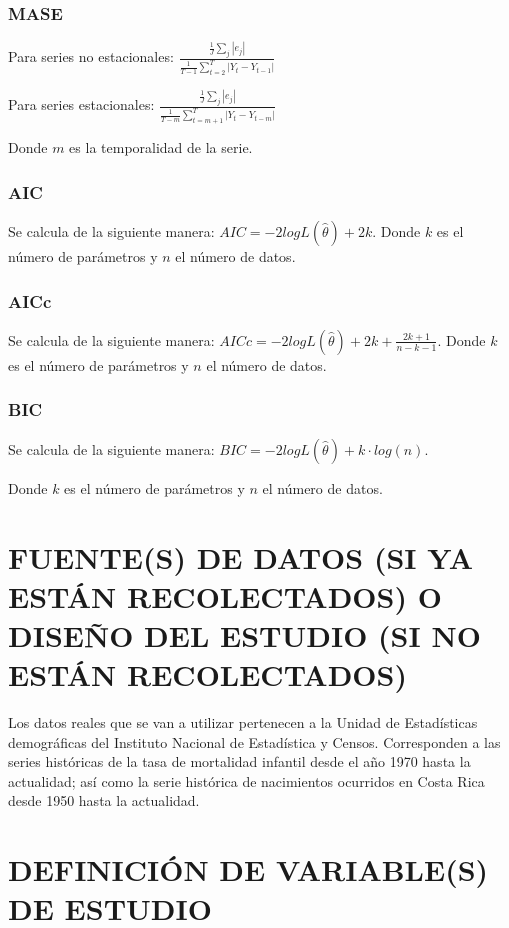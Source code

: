 \documentclass[]{article}
\begin{document}
\subsubsection{MASE}

Para series no estacionales:
\(\frac{\frac{1}{J}\sum_j|e_j|}{\frac{1}{T-1}\sum_{t=2}^T|Y_t-Y_{t-1}|}\)

Para series estacionales:
\(\frac{\frac{1}{J}\sum_j|e_j|}{\frac{1}{T-m}\sum_{t=m+1}^T|Y_t-Y_{t-m}|}\)

Donde \(m\) es la temporalidad de la serie.

\subsubsection{AIC}

Se calcula de la siguiente manera:
\(AIC=-2logL\left(\hat\theta\right)+2k\). Donde \(k\) es el número de
parámetros y \(n\) el número de datos.

\subsubsection{AICc}

Se calcula de la siguiente manera:
\(AICc=-2logL\left(\hat\theta\right)+2k+\frac{2k+1}{n-k-1}\). Donde
\(k\) es el número de parámetros y \(n\) el número de datos.

\subsubsection{BIC}

Se calcula de la siguiente manera:
\(BIC=-2logL\left(\hat\theta\right)+k\cdot log(n)\).

Donde \(k\) es el número de parámetros y \(n\) el número de datos.

\section{FUENTE(S) DE DATOS (SI YA ESTÁN RECOLECTADOS) O DISEÑO DEL ESTUDIO (SI NO ESTÁN RECOLECTADOS)}

Los datos reales que se van a utilizar pertenecen a la Unidad de
Estadísticas demográficas del Instituto Nacional de Estadística y
Censos. Corresponden a las series históricas de la tasa de mortalidad
infantil desde el año 1970 hasta la actualidad; así como la serie
histórica de nacimientos ocurridos en Costa Rica desde 1950 hasta la
actualidad.

\section{DEFINICIÓN DE VARIABLE(S) DE ESTUDIO}
\end{document}
